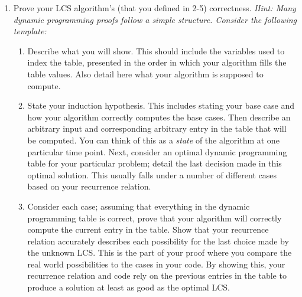 \documentclass[12pt,letterpaper]{article}
\begin{document}
\begin{enumerate}
    \item Prove your LCS algorithm's (that you defined in 2-5) correctness. 
    \textit{Hint: Many dynamic programming proofs follow a simple structure. Consider the following template:}
    \begin{enumerate}
        \item Describe what you will show. This should include the variables used to index the table, presented in the order in which your algorithm fills the table values. 
        Also detail here what your algorithm is supposed to compute.
        \item State your induction hypothesis. 
        This includes stating your base case and how your algorithm correctly computes the base cases.
        Then describe an arbitrary input and corresponding arbitrary entry in the table that will be computed. You can think of this as a \textit{state} of the algorithm at one particular time point.
        Next, consider an optimal dynamic programming table for your particular problem; detail the last decision made in this optimal solution. This usually falls under a number of different cases based on your recurrence relation.
        \item Consider each case; assuming that everything in the dynamic programming table is correct, prove that your algorithm will correctly compute the current entry in the table.
        Show that your recurrence relation accurately describes each possibility for the last choice made by the unknown LCS.
        This is the part of your proof where you compare the real world possibilities to the cases in your code.
        By showing this, your recurrence relation and code rely on the previous entries in the table to produce a solution at least as good as the optimal LCS.
    \end{enumerate}
    \vspace{0.5cm}


\end{enumerate}
\end{document}
